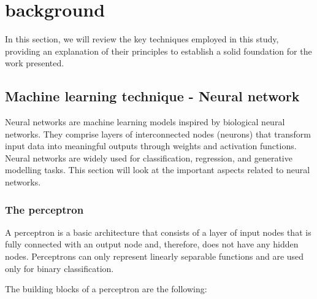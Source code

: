 \section{background}


	In this section, we will review the key techniques employed in this study, providing an explanation of their principles to establish a solid foundation for the work presented.






	
	
	\subsection{Machine learning technique - Neural network}

		
		Neural networks\cite{geron2022hands} are machine learning models inspired by biological neural networks. They comprise layers of interconnected nodes (neurons) that transform input data into meaningful outputs through weights and activation functions. Neural networks are widely used for classification, regression, and generative modelling tasks. This section will look at the important aspects related to neural networks.
		
		
		\bigskip
		\subsubsection{The perceptron}
				
		A perceptron is a basic architecture that consists of a layer of input nodes that is fully connected with an output node and, therefore, does not have any hidden nodes. Perceptrons can only represent linearly separable functions and are used only for binary classification.
		
		The building blocks of a perceptron are the following:
		

